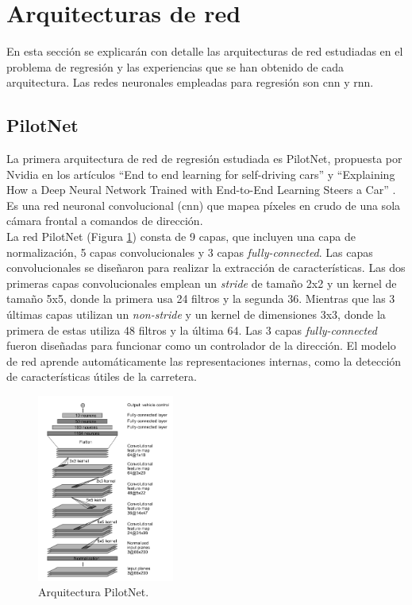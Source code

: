\section{Arquitecturas de red}\label{arquitecturas_reg}

En esta sección se explicarán con detalle las arquitecturas de red estudiadas en el problema de regresión y las experiencias que se han obtenido de cada arquitectura. Las redes neuronales empleadas para regresión son \acrshort{cnn} y \acrshort{rnn}.


\subsection{PilotNet}

La primera arquitectura de red de regresión estudiada es PilotNet, propuesta por Nvidia en los artículos ``End to end learning for self-driving cars'' \cite{end2end} y ``Explaining How a Deep Neural Network Trained with End-to-End Learning Steers a Car'' \cite{explaining-end2end}. Es una red neuronal convolucional (\acrshort{cnn}) que mapea píxeles en crudo de una sola cámara frontal a comandos de dirección.\\


La red PilotNet (Figura \ref{fig.Pilotnet}) consta de 9 capas, que incluyen una capa de normalización, 5 capas convolucionales y 3 capas \textit{fully-connected}. Las capas convolucionales se diseñaron para realizar la extracción de características. Las dos primeras capas convolucionales emplean un \textit{stride} de tamaño 2x2 y un kernel de tamaño 5x5, donde la primera usa 24 filtros y la segunda 36. Mientras que las 3 últimas capas utilizan un \textit{non-stride} y un kernel de dimensiones 3x3, donde la primera de estas utiliza 48 filtros y la última 64. Las 3 capas \textit{fully-connected} fueron diseñadas para funcionar como un controlador de la dirección. El modelo de red aprende automáticamente las representaciones internas, como la detección de características útiles de la carretera.

\begin{figure}
\begin{center}
	\includegraphics[width=0.4\textwidth]{figures/Regresion/pilotnet.png}
   \caption{Arquitectura PilotNet.}
	\label{fig.Pilotnet}
\end{center}
\end{figure}



